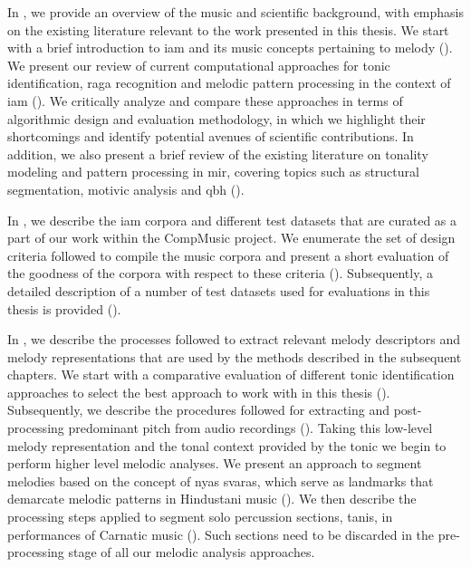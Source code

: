 In , we provide an overview of the music and scientific background, with emphasis on the existing literature relevant to the work presented in this thesis. We start with a brief introduction to \gls{iam} and its music concepts pertaining to melody (). We present our review of current computational approaches for tonic identification, \gls{raga} recognition and melodic pattern processing in the context of \gls{iam} (). We critically analyze and compare these approaches in terms of algorithmic design and evaluation methodology, in which we highlight their shortcomings and identify potential avenues of scientific contributions. In addition, we also present a brief review of the existing literature on tonality modeling and pattern processing in \gls{mir}, covering topics such as structural segmentation, motivic analysis and \gls{qbh} ().

In , we describe the \gls{iam} corpora and different test datasets that are curated as a part of our work within the CompMusic project. We enumerate the set of design criteria followed to compile the music corpora and present a short evaluation of the goodness of the corpora with respect to these criteria (). Subsequently, a detailed description of a number of test datasets used for evaluations in this thesis is provided (). 


In , we describe the processes followed to extract relevant melody descriptors and melody representations that are used by the methods described in the subsequent chapters. We start with a comparative evaluation of different tonic identification approaches to select the best approach to work with in this thesis (). Subsequently, we describe the procedures followed for extracting and post-processing predominant pitch from audio recordings (). Taking this low-level melody representation and the tonal context provided by the tonic we begin to perform higher level melodic analyses. We present an approach to segment melodies based on the concept of \gls{nyas} \glspl{svara}, which serve as landmarks that demarcate melodic patterns in Hindustani music (). We then describe the processing steps applied to segment solo percussion sections, \glspl{tani}, in performances of Carnatic music (). Such sections need to be discarded in the pre-processing stage of all our melodic analysis approaches. 

